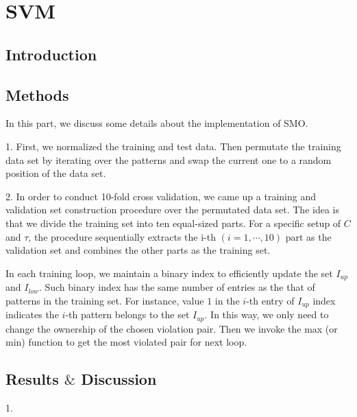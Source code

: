 \section{SVM}

\subsection{Introduction}



\subsection{Methods}

In this part, we discuss some details about the implementation of SMO.


1. First, we normalized the training and test data. Then permutate the training data set by iterating over the patterns and swap the current one to a random position of the data set.  


2. In order to conduct 10-fold cross validation, we came up a training and validation set construction procedure over the permutated data set. The idea is that we divide the training set into ten equal-sized parts. For a specific setup of $C$ and $\tau$, the procedure sequentially extracts the i-th $(i=1,\cdots,10)$ part as the validation set and combines the other parts as the training set.

In each training loop, we maintain a binary index to efficiently update the set $I_{up}$ and $I_{low}$. Such binary index has the same number of entries as the that of patterns in the training set. For instance, value $1$ in the $i$-th entry of $I_{up}$ index indicates the $i$-th pattern belongs to the set $I_{up}$. In this way, we only need to change the ownership of the chosen violation pair. Then we invoke the max (or min) function to get the most violated pair for next loop.   


\subsection{Results	$\&$ Discussion}

1.





